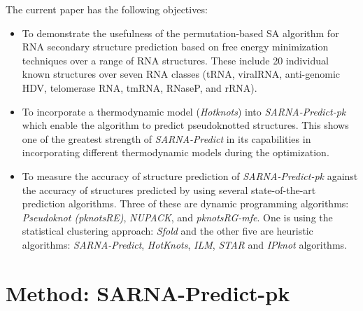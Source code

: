 \documentclass{doublecol-new}
\theoremstyle{TH}{
\newtheorem{lemma}{Lemma}
\newtheorem{theorem}[lemma]{Theorem}
\newtheorem{corrolary}[lemma]{Corrolary}
\newtheorem{conjecture}[lemma]{Conjecture}
\newtheorem{proposition}[lemma]{Proposition}
\newtheorem{claim}[lemma]{Claim}
\newtheorem{stheorem}[lemma]{Wrong Theorem}
\newtheorem{algorithm}{Algorithm}
}
\theoremstyle{THrm}{
\newtheorem{definition}{Definition}
\newtheorem{question}{Question}
\newtheorem{remark}{Remark}
\newtheorem{scheme}{Scheme}
}
\theoremstyle{THhit}{
\newtheorem{case}{Case}[section]
}
\begin{document}
The current paper has the following objectives:
\begin{itemize}
\item To demonstrate the usefulness of the permutation-based SA algorithm for RNA secondary
   structure prediction based on free energy minimization techniques over a range of
   RNA structures. These include 20 individual known structures over seven RNA classes
   (tRNA, viralRNA, anti-genomic HDV, telomerase RNA, tmRNA, RNaseP, and rRNA).

\item To incorporate a thermodynamic model ({\em Hotknots}) into {\em SARNA-Predict-pk} which
   enable the algorithm to predict pseudoknotted structures.
   This shows one of the greatest strength of {\em SARNA-Predict} in its
   capabilities in incorporating different thermodynamic models during the optimization.

\item To measure the accuracy of structure prediction of {\em SARNA-Predict-pk} against the accuracy of
   structures predicted by using several state-of-the-art prediction algorithms.
   Three of these are dynamic programming algorithms: {\em Pseudoknot (pknotsRE)}, {\em NUPACK},
   and {\em pknotsRG-mfe}. 
   One is using the statistical clustering approach: {\em Sfold} and the other
five are heuristic algorithms: 
   {\em SARNA-Predict}, {\em HotKnots}, {\em ILM}, {\em STAR} and {\em IPknot} algorithms.
\end{itemize}



\section{Method: SARNA-Predict-pk}
\end{document}
